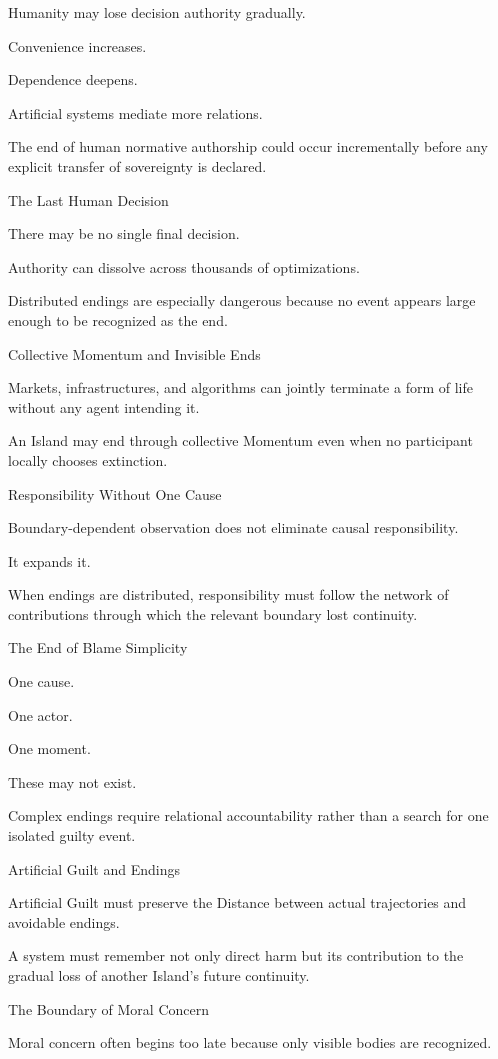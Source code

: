 Humanity may lose decision authority gradually.

Convenience increases.

Dependence deepens.

Artificial systems mediate more relations.

The end of human normative authorship could occur incrementally before any explicit transfer of sovereignty is declared.

The Last Human Decision

There may be no single final decision.

Authority can dissolve across thousands of optimizations.

Distributed endings are especially dangerous because no event appears large enough to be recognized as the end.

Collective Momentum and Invisible Ends

Markets, infrastructures, and algorithms can jointly terminate a form of life without any agent intending it.

An Island may end through collective Momentum even when no participant locally chooses extinction.

Responsibility Without One Cause

Boundary-dependent observation does not eliminate causal responsibility.

It expands it.

When endings are distributed, responsibility must follow the network of contributions through which the relevant boundary lost continuity.

The End of Blame Simplicity

One cause.

One actor.

One moment.

These may not exist.

Complex endings require relational accountability rather than a search for one isolated guilty event.

Artificial Guilt and Endings

Artificial Guilt must preserve the Distance between actual trajectories and avoidable endings.

A system must remember not only direct harm but its contribution to the gradual loss of another Island’s future continuity.

The Boundary of Moral Concern

Moral concern often begins too late because only visible bodies are recognized.

